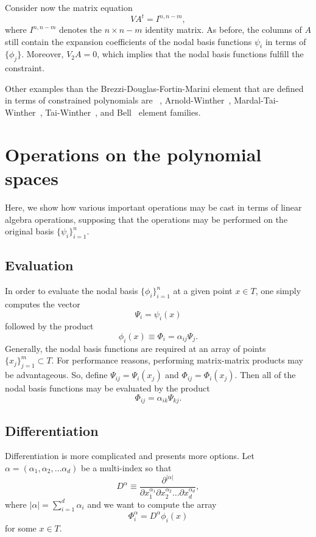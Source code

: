 Consider now the matrix equation
\begin{equation}
\label{eq:extendedvdmsystem}
V A^t = I^{n,n-m},
\end{equation}
where $I^{n,n-m}$ denotes the $n \times n-m$ identity matrix.
As before, the columns of $A$ still contain the expansion coefficients
of the nodal basis functions $\psi_i$ in terms of $\{ \phi_j \}$.
Moreover, $V_2 A = 0$, which implies that the nodal basis functions
fulfill the constraint.

Other examples than the Brezzi-Douglas-Fortin-Marini element
that are defined in terms of constrained polynomials are
\nedelec~\citep{Nedelec1980}, Arnold-Winther~\citep{ArnoldWinther2002},
Mardal-Tai-Winther~\citep{MardalTaiWinther2002},
Tai-Winther~\citep{TaiWinther2006}, and Bell~\citep{Ciarlet2002}
element families.

\section{Operations on the polynomial spaces}
Here, we show how various important operations may be cast in terms of
linear algebra operations, supposing that the operations may be performed
on the original basis $\{ \psi_i \}_{i=1}^{n}$.

\subsection{Evaluation}
In order to evaluate the nodal basis $\{ \phi_i \}_{i=1}^{n}$ at a
given point $x \in T$, one simply computes the vector
\begin{equation}
\Psi_i = \psi_i(x)
\end{equation}
followed by the product
\begin{equation}
\phi_i(x) \equiv \Phi_i = \alpha_{ij} \Psi_j.
\end{equation}
Generally, the nodal basis functions are required at an array of points
$\{ x_j \}_{j=1}^{m} \subset T$.  For performance reasons, performing
matrix-matrix products may be advantageous.  So, define $\Psi_{ij} =
\Psi_i(x_j)$ and $\Phi_{ij} = \Phi_i(x_j)$.  Then all of the nodal
basis functions may be evaluated by the product
\begin{equation}
\Phi_{ij} = \alpha_{ik} \Psi_{kj}.
\end{equation}
\subsection{Differentiation}
Differentiation is more complicated and presents more options.
Let $\alpha = ( \alpha_1 , \alpha_2 , \dots \alpha_d )$ be a
multi-index so that
\begin{equation}
D^\alpha \equiv \frac{\partial^{|\alpha|}}{\partial
  x_1^{\alpha_1} \partial x_2^{\alpha_2} \dots \partial x_d^{\alpha_d}},
\end{equation}
where $|\alpha| = \sum_{i=1}^{d} \alpha_i$ and we want
to compute the array
\begin{equation}
\Phi^\alpha_i = D^\alpha \phi_i(x)
\end{equation}
for some $x \in T$.

